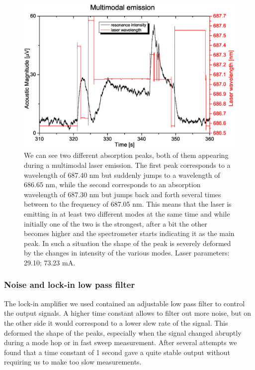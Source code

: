 \begin{figure}
\includegraphics[width=\linewidth, draft=\foto]{eps/multimode.eps}
\caption{We can see two different absorption peaks, both of them appearing during a multimodal laser emission. The first peak corresponds to a wavelength of 687.40 nm but suddenly jumps to a wavelength of 686.65 nm, while the second corresponds to an absorption wavelength of 687.30 nm but jumps back and forth several times between to the frequency of 687.05 nm. This means that the laser is emitting in at least two different modes at the same time and while initially one of the two is the strongest, after a bit the other becomes higher and the spectrometer starts indicating it as the main peak. In such a situation the shape of the peak is severely deformed by the changes in intensity of the various modes.
Laser parameters: 29.10\cel; 73.23 mA.}
\label{multimodes}
\end{figure} 

\subsubsection{Noise and lock-in low pass filter}
The lock-in amplifier we used contained an adjustable low pass filter to control the output signals. A higher time constant allows to filter out more noise, but on the other side it would correspond to a lower slew rate of the signal. This deformed the shape of the peaks, especially when the signal changed abruptly during a mode hop or in fast sweep measurement. After several attempts we found that a time constant of 1 second gave a quite stable output without requiring us to make too slow measurements.